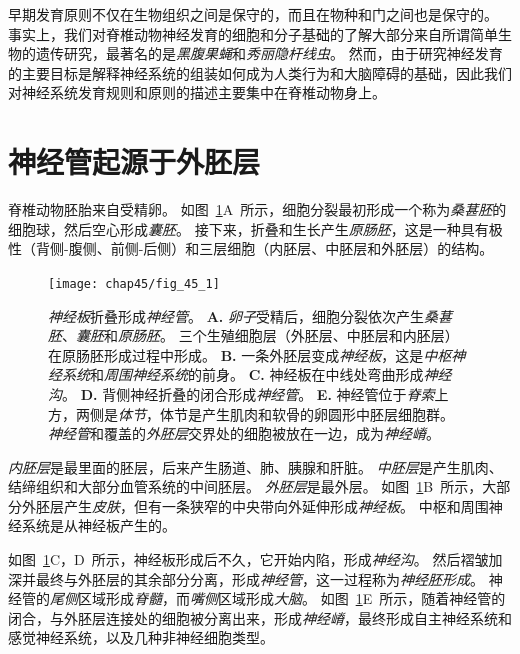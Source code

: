 早期发育原则不仅在生物组织之间是保守的，而且在物种和门之间也是保守的。
事实上，我们对脊椎动物神经发育的细胞和分子基础的了解大部分来自所谓简单生物的遗传研究，最著名的是\textit{黑腹果蝇}和\textit{秀丽隐杆线虫}。
然而，由于研究神经发育的主要目标是解释神经系统的组装如何成为人类行为和大脑障碍的基础，因此我们对神经系统发育规则和原则的描述主要集中在脊椎动物身上。



\section{神经管起源于外胚层}

脊椎动物胚胎来自受精卵。
如图~\ref{fig:45_1}A~所示，细胞分裂最初形成一个称为\textit{桑葚胚}的细胞球，然后空心形成\textit{囊胚}。
接下来，折叠和生长产生\textit{原肠胚}，这是一种具有极性（背侧-腹侧、前侧-后侧）和三层细胞（内胚层、中胚层和外胚层）的结构。


\begin{figure}[htbp]
	\centering
	\texttt{[image: chap45/fig\_45\_1]}
	\caption{\textit{神经板}折叠形成\textit{神经管}。
		\textbf{A.} \textit{卵子}受精后，细胞分裂依次产生\textit{桑葚胚}、\textit{囊胚}和\textit{原肠胚}。
		三个生殖细胞层（外胚层、中胚层和内胚层）在原肠胚形成过程中形成。
		\textbf{B.} 一条外胚层变成\textit{神经板}，这是\textit{中枢神经系统}和\textit{周围神经系统}的前身。
		\textbf{C.} 神经板在中线处弯曲形成\textit{神经沟}。
		\textbf{D.} 背侧神经折叠的闭合形成\textit{神经管}。
		\textbf{E.} 神经管位于\textit{脊索}上方，两侧是\textit{体节}，体节是产生肌肉和软骨的卵圆形中胚层细胞群。
		\textit{神经管}和覆盖的\textit{外胚层}交界处的细胞被放在一边，成为\textit{神经嵴}。}
	\label{fig:45_1}
\end{figure}


\textit{内胚层}是最里面的胚层，后来产生肠道、肺、胰腺和肝脏。
\textit{中胚层}是产生肌肉、结缔组织和大部分血管系统的中间胚层。
\textit{外胚层}是最外层。
如图~\ref{fig:45_1}B~所示，大部分外胚层产生\textit{皮肤}，但有一条狭窄的中央带向外延伸形成\textit{神经板}。
中枢和周围神经系统是从神经板产生的。


如图~\ref{fig:45_1}C，D~所示，神经板形成后不久，它开始内陷，形成\textit{神经沟}。
然后褶皱加深并最终与外胚层的其余部分分离，形成\textit{神经管}，这一过程称为\textit{神经胚形成}。
神经管的\textit{尾侧}区域形成\textit{脊髓}，而\textit{嘴侧}区域形成\textit{大脑}。
如图~\ref{fig:45_1}E~所示，随着神经管的闭合，与外胚层连接处的细胞被分离出来，形成\textit{神经嵴}，最终形成自主神经系统和感觉神经系统，以及几种非神经细胞类型。



